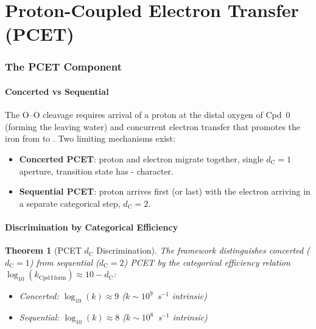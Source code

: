 \documentclass[11pt,twocolumn,a4paper]{article}
\newtheorem{theorem}{Theorem}[section]
\theoremstyle{definition}
\theoremstyle{remark}
\newcommand{\dC}{d_{\mathrm{C}}}
\begin{document}
\part{Proton-Coupled Electron Transfer (PCET)}

\section{The PCET Component}
\label{sec:pcet}

\subsection{Concerted vs Sequential}

The O--O cleavage requires arrival of a proton at the distal oxygen of
Cpd~0 (forming the leaving water) and concurrent electron transfer
that promotes the iron from  to . Two limiting
mechanisms exist:
\begin{itemize}[nosep]
\item \textbf{Concerted PCET}: proton and electron migrate together, single
  $\dC = 1$ aperture, transition state has -\dotsb
  \dotsb{} character.
\item \textbf{Sequential PCET}: proton arrives first (or last) with the
  electron arriving in a separate categorical step, $\dC = 2$.
\end{itemize}

\subsection{Discrimination by Categorical Efficiency}

\begin{theorem}[PCET $\dC$ Discrimination]
\label{thm:pcet_dc}
The framework distinguishes concerted ($\dC = 1$) from sequential
($\dC = 2$) PCET by the categorical efficiency relation
$\log_{10}(k_{\mathrm{Cpd\,I\,form}}) \approx 10 - \dC$:
\begin{itemize}[nosep]
\item Concerted: $\log_{10}(k) \approx 9$ ($k \sim 10^9$~s$^{-1}$ intrinsic)
\item Sequential: $\log_{10}(k) \approx 8$ ($k \sim 10^8$~s$^{-1}$ intrinsic)
\end{itemize}
\end{theorem}
\end{document}
